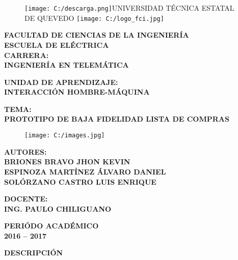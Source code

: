 \documentclass [11pt] {article}
\begin{document}
\begin{figure}[h]
\begin{center} 
 \texttt{[image: C:/descarga.png]}UNIVERSIDAD TÉCNICA ESTATAL DE QUEVEDO  \hspace{0,1cm}\texttt{[image: C:/logo\_fci.jpg]}
\end{center}
\end{figure}

\begin{center}
\bf FACULTAD DE CIENCIAS DE LA INGENIERÍA\\
\bf ESCUELA DE ELÉCTRICA\\

\vspace{0,5cm}
 \bf CARRERA:\\
INGENIERÍA EN TELEMÁTICA

\vspace{0,5cm}
 \bf UNIDAD DE APRENDIZAJE:\\
INTERACCIÓN HOMBRE-MÁQUINA

\vspace{0,5cm}
 \bf TEMA:\\
PROTOTIPO DE BAJA  FIDELIDAD LISTA DE COMPRAS\\
\end{center}

\begin{figure}[h]
\begin{center} 
\texttt{[image: C:/images.jpg]}
\end{center}
\end{figure}

\begin{center}
 \bf AUTORES:\\
BRIONES BRAVO JHON KEVIN\\
ESPINOZA MARTÍNEZ ÁLVARO DANIEL\\
SOLÓRZANO CASTRO LUIS ENRIQUE

\vspace{0,5cm}
 \bf DOCENTE:\\
ING. PAULO CHILIGUANO

\vspace{0,5cm}
 \bf PERIÓDO ACADÉMICO\\
2016 – 2017 

\vspace{0,5cm}
 \bf DESCRIPCIÓN\\
\end{center}
\end{document}
